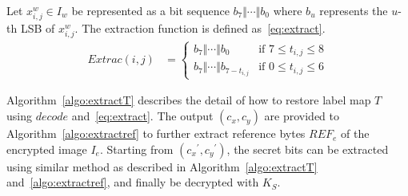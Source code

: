 Let $x^w_{i, j} \in I_w$ be represented as a bit sequence $b_7 \Vert \cdots \Vert b_0$ 
where $b_u$ represents the $u$-th LSB of $x^w_{i, j}$.
The extraction function is defined as~\eqref{eq:extract}.
\begin{align}
	\label{eq:extract}
	Extrac(i, j)  &= 
	\begin{cases}
		b_7 \Vert \cdots \Vert b_0 & \text{if }  7 \leq t_{i, j} \leq 8 \\
		b_7 \Vert \cdots \Vert b_{7 - t_{i, j}} & \text{if }  0 \leq t_{i, j} \leq 6
	\end{cases}
\end{align}

Algorithm~\ref{algo:extractT} describes the detail of how to restore label map $T$ using $decode$ and~\eqref{eq:extract}.
The output $(c_x, c_y)$ are provided to Algorithm~\ref{algo:extractref} to further extract reference bytes $REF_e$ of the encrypted image $I_e$.
Starting from $({c_x}^\prime, {c_y}^\prime)$, the secret bits can be extracted using similar method as described in Algorithm~\ref{algo:extractT} and~\ref{algo:extractref}, and finally be decrypted with $K_S$.



